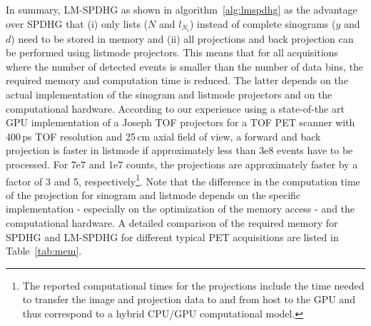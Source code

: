 In summary, LM-SPDHG as shown in algorithm~\ref{alg:lmspdhg} as the advantage over SPDHG
that (i) only lists ($N$ and $l_{N_i}$) instead of complete sinograms ($y$ and $d$) need to be 
stored in memory and (ii) all projections and back projection can be performed using listmode
projectors.
This means that for all acquisitions where the number of detected events is smaller than
the number of data bins, the required memory and computation time is reduced.
The latter depends on the actual implementation of the sinogram and listmode projectors
and on the computational hardware.
According to our experience using a state-of-the art GPU implementation of a Joseph TOF projectors
for a TOF PET scanner with 400\,ps TOF resolution and 25\,cm axial field of view,
a forward and back projection is faster in listmode if approximately less than 3e8 events 
have to be processed.
For 7e7 and 1e7 counts, the projections are approximately faster by a factor of 3 and 5,
respectively\footnote{The reported computational times for the projections include the time
needed to transfer the image and projection data to and from host to the GPU and thus
correspond to a hybrid CPU/GPU computational model.}.
Note that the difference in the computation time of the projection for sinogram and listmode 
depends on the specific implementation - especially on the optimization of the memory access - 
and the computational hardware.
A detailed comparison of the required memory for SPDHG and LM-SPDHG for different typical PET
acquisitions are listed in Table~\ref{tab:mem}.

